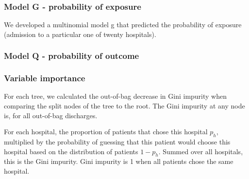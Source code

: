 \documentclass[]{article}
\begin{document}
\subsubsection{Model G - probability of exposure}
We developed a multinomial model g that predicted the probability of exposure (admission to a particular one of twenty hospitals). 


\subsubsection{Model Q - probability of outcome}


\subsubsection{Variable importance}
For each tree, we calculated the out-of-bag decrease in Gini impurity when comparing the split nodes of the tree to the root. 
The Gini impurity at any node is, for all out-of-bag discharges.

For each hospital, the proportion of patients that chose this hospital $p_h$, multiplied by the probability of guessing that this patient would choose this hospital based on the distribution of patients $1-p_h$. Summed over all hospitals, this is the Gini impurity. Gini impurity is 1 when all patients chose the same hospital.
\end{document}

